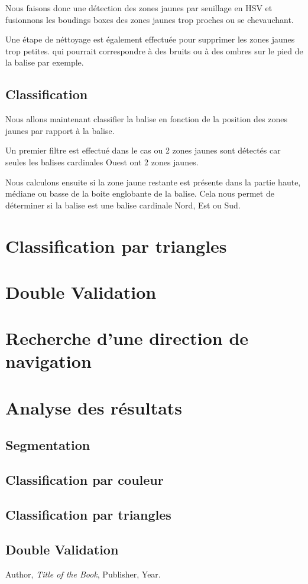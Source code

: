 \documentclass{article}
\begin{document}
Nous faisons donc une détection des zones jaunes par seuillage en HSV et fusionnons les boudings boxes des zones jaunes trop proches ou se chevauchant.

Une étape de néttoyage est également effectuée pour supprimer les zones jaunes trop petites.
qui pourrait correspondre à des bruits ou à des ombres sur le pied de la balise par exemple.

\subsection{Classification}

Nous allons maintenant classifier la balise en fonction de la position des zones jaunes par rapport à la balise.

Un premier filtre est effectué dans le cas ou 2 zones jaunes sont détectés car seules
les balises cardinales Ouest ont 2 zones jaunes.

Nous calculons ensuite si la zone jaune restante est présente dans la partie haute, médiane ou basse de la boite englobante de la balise.
Cela nous permet de déterminer si la balise est une balise cardinale Nord, Est ou Sud.


\section{Classification par triangles}

\section{Double Validation}

\section{Recherche d'une direction de navigation}

\section{Analyse des résultats}
\subsection{Segmentation}
\subsection{Classification par couleur}
\subsection{Classification par triangles}
\subsection{Double Validation}

\begin{thebibliography}{9}
     Author, \textit{Title of the Book}, Publisher, Year.
\end{thebibliography}
\end{document}
